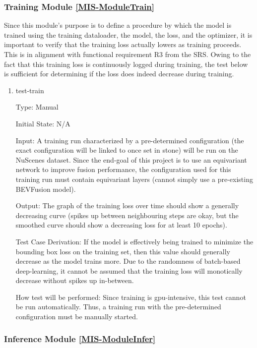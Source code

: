 \documentclass[12pt, titlepage]{article}
\begin{document}
\subsubsection{Training Module \ref{MIS-ModuleTrain}}

Since this module's purpose is to define a procedure by which the model is trained using the 
training dataloader, the model, the loss, and the optimizer, it is important to verify that the training loss
actually lowers as training proceeds. This is in alignment with functional requirement R3 from the SRS. 
Owing to the fact that this training loss is continuously logged during training, the test below is 
sufficient for determining if the loss does indeed decrease during training.

\begin{enumerate}

\item{test-train\\}

Type: Manual

Initial State: N/A
					
Input: A training run characterized by a pre-determined configuration (the exact configuration will be linked to once set in stone) will be run on the NuScenes dataset. Since the end-goal of this project is to use an equivariant network to improve fusion performance, the configuration used for this training run must contain equivariant layers (cannot simply use a pre-existing BEVFusion model).
					
Output: The graph of the training loss over time should show a generally decreasing curve (spikes up between neighbouring steps are okay, but the smoothed curve should show a decreasing loss for at least 10 epochs).

Test Case Derivation: If the model is effectively being trained to minimize the bounding box loss on the training set, then this value should generally decrease as the model trains more. Due to the randomness of batch-based deep-learning, it cannot be assumed that the training loss will monotically decrease without spikes up in-between.

How test will be performed: Since training is gpu-intensive, this test cannot be run automatically. Thus, a training run with the pre-determined configuration must be manually started. 
    
\end{enumerate}

\subsubsection{Inference Module \ref{MIS-ModuleInfer}}
\end{document}
